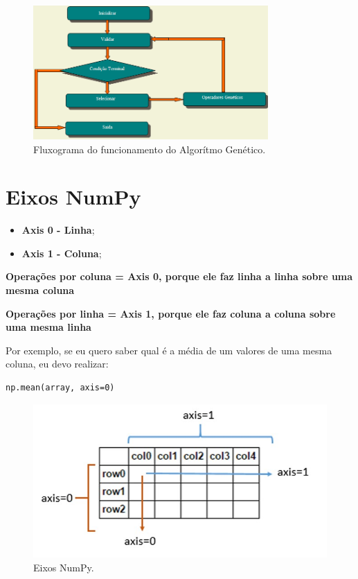 \documentclass[12pt]{article}
\providecommand{\tightlist}{%
\setlength{\itemsep}{0pt}\setlength{\parskip}{0pt}}
\begin{document}
\begin{figure}[h]
	\centering
	\includegraphics[width=0.8\textwidth]{imgs/fluxograma_ag.png}
	\caption{Fluxograma do funcionamento do Algorítmo Genético.}
	\label{}
\end{figure}

\hypertarget{eixos-numpy}{%
\section{Eixos NumPy}\label{eixos-numpy}}

\begin{itemize}
\tightlist
\item
  \textbf{Axis 0 - Linha};
\item
  \textbf{Axis 1 - Coluna};
\end{itemize}

\textbf{Operações por coluna = Axis 0, porque ele faz linha a linha
sobre uma mesma coluna}

\textbf{Operações por linha = Axis 1, porque ele faz coluna a coluna
sobre uma mesma linha}

    Por exemplo, se eu quero saber qual é a média de um valores de uma mesma
coluna, eu devo realizar:

\begin{verbatim}
np.mean(array, axis=0)
\end{verbatim}

\begin{figure}
  \centering
  \includegraphics[width=0.5\linewidth]{imgs/axis_numpy.jpg}
  \caption{Eixos NumPy.}
\end{figure}
\end{document}
